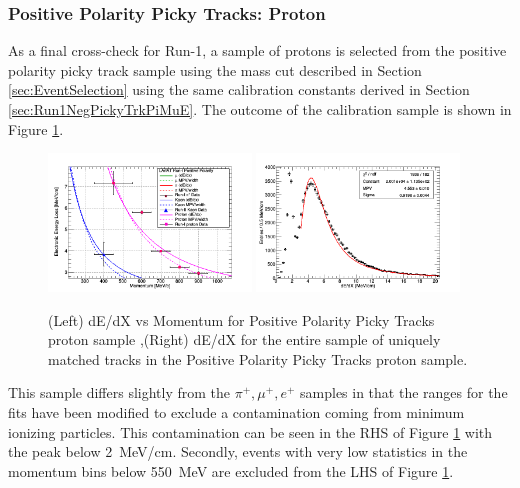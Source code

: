 \subsubsection{Positive Polarity Picky Tracks: Proton}\label{sec:Run1PosPickyTrkProton}

As a final cross-check for Run-1, a sample of protons is selected from the positive polarity picky track sample using the mass cut described in Section \ref{sec:EventSelection} using the same calibration constants derived in Section \ref{sec:Run1NegPickyTrkPiMuE}. The outcome of the calibration sample is shown in Figure \ref{fig:Run1PosPickyTrkProtonResults}.

\begin{figure}[htb]
\centering
\includegraphics[width=0.48\textwidth]{images/dEdXvsMomentumPosPolRun1ProtonFineBin.png}
\includegraphics[width=0.48\textwidth]{images/dEdXPosPolRun1Proton.png}
\caption{(Left) dE/dX vs Momentum for Positive Polarity Picky Tracks proton sample ,(Right) dE/dX for the entire sample of uniquely matched tracks in the Positive Polarity Picky Tracks proton sample.}
\label{fig:Run1PosPickyTrkProtonResults}
\end{figure}

This sample differs slightly from the $\pi^{+}, \mu^{+}, e^{+}$ samples in that the ranges for the fits have been modified to exclude a contamination coming from minimum ionizing particles. This contamination can be seen in the RHS of Figure \ref{fig:Run1PosPickyTrkProtonResults} with the peak below 2~MeV/cm. Secondly, events with very low statistics in the momentum bins below 550~MeV are excluded from the LHS of Figure \ref{fig:Run1PosPickyTrkProtonResults}.

